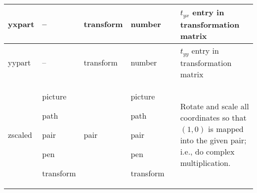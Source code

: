 \begin{longtable}{|>{\raggedright{}\ttfamily}p{.793in}*{3}{|>{\raggedright}p{.715in}}|>{\raggedleft}p{1.5em}|>{\raggedright\arraybackslash}X|}
yxpart&  --&  transform&  number&  \pageref{Dtrprt}&  $t_{yx}$ entry in transformation matrix\\\hline
yypart&  --&  transform&  number&  \pageref{Dtrprt}&  $t_{yy}$ entry in transformation matrix\\\hline
zscaled&  picture\par path\par pair\par pen\par transform&  pair&  picture\par path\par pair\par pen\par transform&  \pageref{Dtranop}&  Rotate and scale all coordinates so that $(1,0)$ is mapped into the given pair; i.e., do complex multiplication.\\\hline
\end{longtable}

